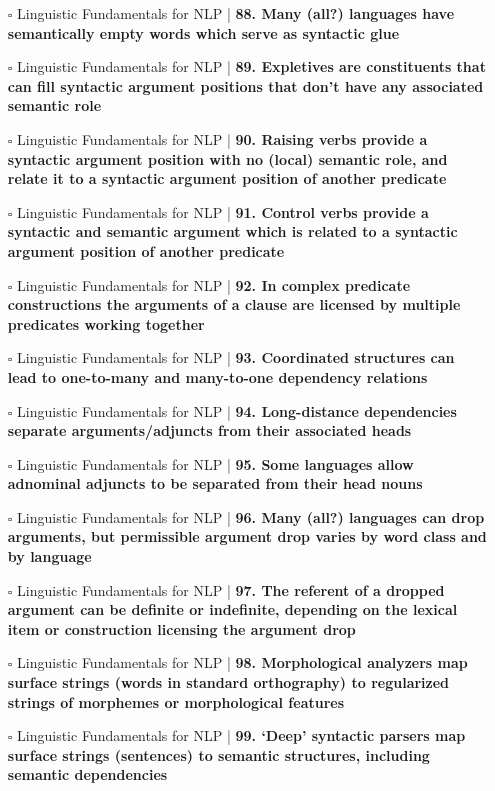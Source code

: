 \documentclass[a4, landscape, 12pt]{article}
\newcommand{\checkbox}{$\square$}%
\begin{document}
\begin{itemize}
{}
\item [\checkbox]  Linguistic Fundamentals for NLP | \textbf{ 88. Many (all?) languages have semantically empty words which serve as syntactic glue
}
\item [\checkbox]  Linguistic Fundamentals for NLP | \textbf{ 89. Expletives are constituents that can fill syntactic argument positions that don’t have any associated semantic role
}
\item [\checkbox]  Linguistic Fundamentals for NLP | \textbf{ 90. Raising verbs provide a syntactic argument position with no (local) semantic role, and relate it to a syntactic argument position of another predicate
}
\item [\checkbox]  Linguistic Fundamentals for NLP | \textbf{ 91. Control verbs provide a syntactic and semantic argument which is related to a syntactic argument position of another predicate
}
\item [\checkbox]  Linguistic Fundamentals for NLP | \textbf{ 92. In complex predicate constructions the arguments of a clause are licensed by multiple predicates working together
}
\item [\checkbox]  Linguistic Fundamentals for NLP | \textbf{ 93. Coordinated structures can lead to one-to-many and many-to-one dependency relations
}
\item [\checkbox]  Linguistic Fundamentals for NLP | \textbf{ 94. Long-distance dependencies separate arguments/adjuncts from their associated heads
}
\item [\checkbox]  Linguistic Fundamentals for NLP | \textbf{ 95. Some languages allow adnominal adjuncts to be separated from their head nouns
}
\item [\checkbox]  Linguistic Fundamentals for NLP | \textbf{ 96. Many (all?) languages can drop arguments, but permissible argument drop varies by word class and by language
}
\item [\checkbox]  Linguistic Fundamentals for NLP | \textbf{ 97. The referent of a dropped argument can be definite or indefinite, depending on the lexical item or construction licensing the argument drop
}
\item [\checkbox]  Linguistic Fundamentals for NLP | \textbf{ 98. Morphological analyzers map surface strings (words in standard orthography) to regularized strings of morphemes or morphological features
}
\item [\checkbox]  Linguistic Fundamentals for NLP | \textbf{ 99. ‘Deep’ syntactic parsers map surface strings (sentences) to semantic structures, including semantic dependencies
}
\end{itemize}
\end{document}
